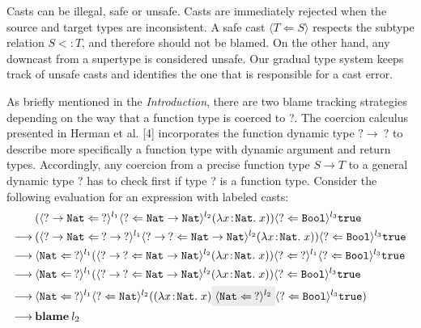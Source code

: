 Casts can be illegal, safe or unsafe. Casts are immediately rejected 
when the source and target types are inconsistent. A safe cast 
$\langle T \Leftarrow S \rangle$ respects 
the subtype relation $S <: T$, and therefore should not be blamed. 
On the other hand, any downcast from a supertype is considered unsafe. 
Our gradual type system keeps track of unsafe casts and identifies the 
one that is responsible for a cast error. 

As briefly mentioned in the \textit{Introduction}, there are two blame 
tracking strategies depending on the way that a function type is coerced 
to ?. The coercion calculus presented in Herman et al. [4] 
incorporates the function dynamic type $ ? \rightarrow \: ? $ 
to describe more specifically a function type with dynamic argument and return 
types. Accordingly, any coercion from a precise function type $S \rightarrow T$ 
to a general dynamic type ? has to check first if type ? 
is a function type. Consider the following evaluation for an expression 
with labeled casts:
\begin{align*}
    & (\langle ? \rightarrow \texttt{Nat} \Leftarrow 
    \: ? \rangle ^{l_1}
    \langle ? \Leftarrow 
    \texttt{Nat} \rightarrow \texttt{Nat} \rangle ^{l_2}
    (\lambda x \! : \! \texttt{Nat} . \; x)) 
    \langle ? \Leftarrow \texttt{Bool} \rangle ^{l_3} \texttt{true} \\
    \longrightarrow \:
    & (\langle ? \rightarrow \texttt{Nat} \Leftarrow 
    \: ? \rightarrow \: ? \rangle ^{l_1}
    \langle ? \rightarrow \: ? \Leftarrow 
    \texttt{Nat} \rightarrow \texttt{Nat} \rangle ^{l_2}
    (\lambda x \! : \! \texttt{Nat} . \; x)) 
    \langle ? \Leftarrow \texttt{Bool} \rangle ^{l_3} \texttt{true} \\
    \longrightarrow \:
    & \langle \texttt{Nat} \Leftarrow \: ? \rangle ^{l_1} 
    (\langle ? \rightarrow \: ? \Leftarrow 
    \texttt{Nat} \rightarrow \texttt{Nat} \rangle ^{l_2}
    (\lambda x \! : \! \texttt{Nat} . \; x))
    \langle ? \Leftarrow \: ? \rangle ^{l_1} 
    \langle ? \Leftarrow \texttt{Bool} \rangle ^{l_3} \texttt{true} \\
    \longrightarrow \:
    & \langle \texttt{Nat} \Leftarrow \: ? \rangle ^{l_1} 
    (\langle ? \rightarrow \: ? \Leftarrow 
    \texttt{Nat} \rightarrow \texttt{Nat} \rangle ^{l_2}
    (\lambda x \! : \! \texttt{Nat} . \; x)) 
    \langle ? \Leftarrow \texttt{Bool} \rangle ^{l_3} \texttt{true} \\
    \longrightarrow \: 
    & \langle \texttt{Nat} \Leftarrow \: ? \rangle ^{l_1} 
    \langle ? \Leftarrow \texttt{Nat} \rangle ^{l_2} 
    ((\lambda x \! : \! \texttt{Nat} . \; x) 
    \highlight{\langle \texttt{Nat} \Leftarrow \: ? \rangle ^{l_2}}
    \langle ? \Leftarrow \texttt{Bool} \rangle ^{l_3} \texttt{true}) \\
    \longrightarrow \:
    & \textbf{blame} \: l_2
\end{align*}
